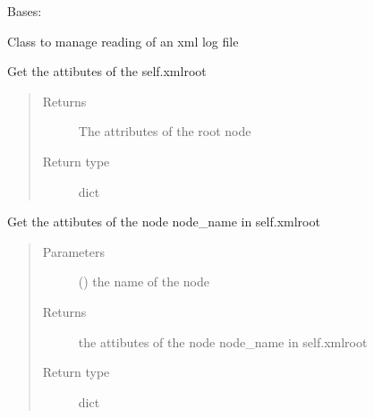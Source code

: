 \documentclass[a4paper,10pt,english]{sphinxmanual}
\begin{document}
\begin{fulllineitems}
\label{\detokenize{commands/apidoc/src:src.xmlManager.ReadXmlFile}}
Bases: 

Class to manage reading of an xml log file

\begin{fulllineitems}
\label{\detokenize{commands/apidoc/src:src.xmlManager.ReadXmlFile.getRootAttrib}}
Get the attibutes of the self.xmlroot
\begin{quote}\begin{description}
\item[{Returns}] \leavevmode
The attributes of the root node

\item[{Return type}] \leavevmode
dict

\end{description}\end{quote}

\end{fulllineitems}


\begin{fulllineitems}
\label{\detokenize{commands/apidoc/src:src.xmlManager.ReadXmlFile.get_attrib}}
Get the attibutes of the node node\_name in self.xmlroot
\begin{quote}\begin{description}
\item[{Parameters}] \leavevmode
{} () \textendash{} the name of the node

\item[{Returns}] \leavevmode
the attibutes of the node node\_name in self.xmlroot

\item[{Return type}] \leavevmode
dict

\end{description}\end{quote}


\end{fulllineitems}
\end{fulllineitems}
\end{document}
